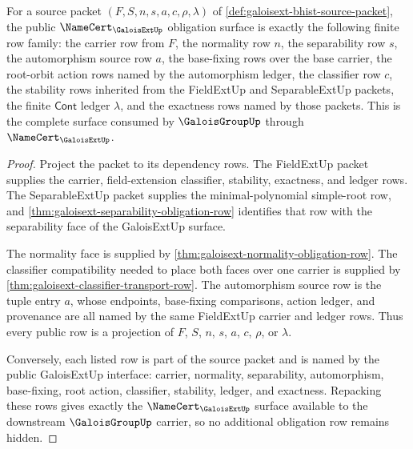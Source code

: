 \begin{theorem}
\label{thm:galoisext-public-obligation-boundary}
For a source packet $(F,S,n,s,a,c,\rho,\lambda)$ of
\autoref{def:galoisext-bhist-source-packet}, the public
$\NameCert_{\GaloisExtUp}$ obligation surface is exactly the following finite
row family: the carrier row from $F$, the normality row $n$, the separability
row $s$, the automorphism source row $a$, the base-fixing rows over the base
carrier, the root-orbit action rows named by the automorphism ledger, the
classifier row $c$, the stability rows inherited from the FieldExtUp and
SeparableExtUp packets, the finite $\mathsf{Cont}$ ledger $\lambda$, and the
exactness rows named by those packets. This is the complete surface consumed
by $\GaloisGroupUp$ through
$\NameCert_{\GaloisExtUp}$.
\end{theorem}
\begin{proof}
Project the packet to its dependency rows. The FieldExtUp packet supplies the
carrier, field-extension classifier, stability, exactness, and ledger rows.
The SeparableExtUp packet supplies the minimal-polynomial simple-root row, and
\autoref{thm:galoisext-separability-obligation-row} identifies that row with
the separability face of the GaloisExtUp surface.

The normality face is supplied by
\autoref{thm:galoisext-normality-obligation-row}. The classifier compatibility
needed to place both faces over one carrier is supplied by
\autoref{thm:galoisext-classifier-transport-row}. The automorphism source row
is the tuple entry $a$, whose endpoints, base-fixing comparisons, action
ledger, and provenance are all named by the same FieldExtUp carrier and
ledger rows. Thus every public row is a projection of $F$, $S$, $n$, $s$, $a$,
$c$, $\rho$, or $\lambda$.

Conversely, each listed row is part of the source packet and is named by the
public GaloisExtUp interface: carrier, normality, separability, automorphism,
base-fixing, root action, classifier, stability, ledger, and exactness.
Repacking these rows gives exactly the $\NameCert_{\GaloisExtUp}$ surface
available to the downstream $\GaloisGroupUp$ carrier, so no additional
obligation row remains hidden.
\end{proof}

